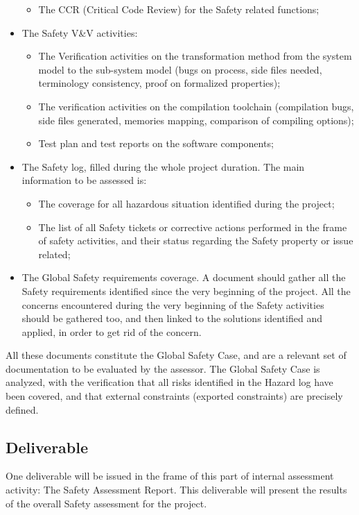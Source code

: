 \documentclass{template/openetcs_article}
\begin{document}
\begin{itemize}
\begin{itemize}
	\item The CCR (Critical Code Review) for the Safety related functions;
	\end{itemize}
\item The Safety V\&V activities:
	\begin{itemize}
\item The Verification activities on the transformation method from the system model to the sub-system model (bugs on process, side files needed, terminology
consistency, proof on formalized properties);
	\item The verification activities on the compilation toolchain (compilation bugs, side files generated, memories mapping, comparison of compiling options);
	\item Test plan and test reports on the software components;
	\end{itemize}
\item The Safety log, filled during the whole project duration. The main information to be assessed is:
	\begin{itemize}
	\item The coverage for all hazardous situation identified during the project;
\item The list of all Safety tickets or corrective actions performed in the frame of safety activities, and their status regarding the Safety property or issue
related;
	\end{itemize}
\item The Global Safety requirements coverage. A document should gather all the Safety requirements identified since the very beginning of the project. All
the concerns encountered during the very beginning of the Safety activities should be gathered too, and then linked to the solutions identified and applied, in
order to get rid of the concern.
\end{itemize}

All these documents constitute the Global Safety Case, and are a relevant set of documentation to be evaluated by the assessor. The Global Safety Case is
analyzed, with the verification that all risks identified in the Hazard log have been covered, and that external constraints (exported constraints) are
precisely defined.


\subsection{Deliverable}
One deliverable will be issued in the frame of this part of internal assessment activity: The Safety Assessment Report. This deliverable will present the
results of the overall Safety assessment for the project.
\end{document}
